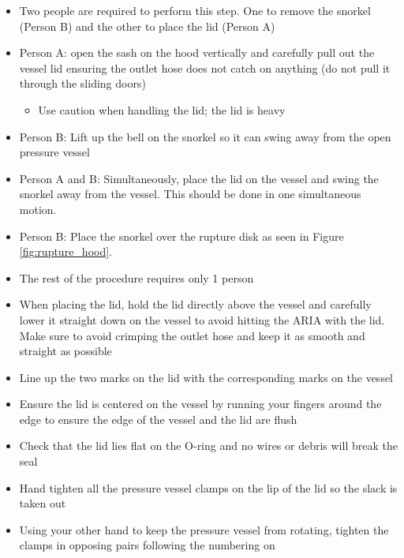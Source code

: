 \documentclass[letterpaper,11pt]{article}
\begin{document}
\begin{enumerate}
        \begin{itemize}
        \item Two people are required to perform this step. One to remove the 
            snorkel (Person B) and the other to place the lid (Person A)            
        \item Person A: open the sash on the hood vertically and carefully  
            pull out the vessel lid ensuring the outlet hose does not catch  
            on anything (do not pull it through the sliding doors)
            \begin{itemize}
            \item Use caution when handling the lid; the lid is heavy
            \end{itemize}
        \item Person B: Lift up the bell on the snorkel so it can swing away
            from the open pressure vessel
        \item Person A and B: Simultaneously, place the lid on the vessel and
            swing the snorkel away from the vessel. This should be done in one
            simultaneous motion.
        \item Person B: Place the snorkel over the rupture disk as seen in 
            Figure \ref{fig:rupture_hood}.
        \item The rest of the procedure requires only 1 person
        \item When placing the lid, hold the lid directly above the vessel and 
            carefully lower it straight down on the vessel to avoid hitting the
            ARIA with the lid. Make sure to avoid crimping the outlet hose and 
            keep it as smooth and straight as possible
        \item Line up the two marks on the lid with the corresponding marks 
            on the vessel
        \item Ensure the lid is centered on the vessel by running your fingers
            around the edge to ensure the edge of the vessel and the lid are
            flush 
        \item Check that the lid lies flat on the O-ring and no wires or debris 
            will break the seal
        \item Hand tighten all the pressure vessel clamps on the lip of the lid 
            so the slack is taken out
        \item Using your other hand to keep the pressure vessel from rotating, 
			tighten the clamps in opposing pairs following the numbering on 

\end{itemize}
\end{enumerate}
\end{document}
